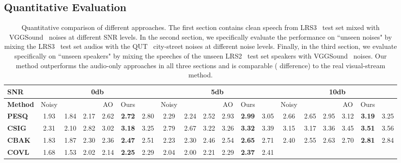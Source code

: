 \documentclass[10pt,twocolumn,letterpaper]{article}
\begin{document}
\subsection{Quantitative Evaluation}


\begin{table*}[ht]
  \setlength{\tabcolsep}{3.1pt}
    \centering
    \caption{Quantitative comparison of different approaches. The first section contains clean speech from LRS3~\cite{Afouras18d} test set mixed with VGGSound~\cite{9053174} noises at different SNR levels. In the second section, we specifically evaluate the performance on ``unseen noises" by mixing the LRS3~\cite{Afouras18d} test set audios with the QUT~\cite{9053174} city-street noises at different noise levels. Finally, in the third section, we evaluate specifically on ``unseen speakers" by mixing the speeches of the unseen LRS2~\cite{Afouras18c} test set speakers with VGGSound~\cite{9053174} noises. Our method outperforms the audio-only approaches in all three sections and is comparable ( difference) to the real visual-stream method.}
    \begin{tabular}{l||ccc|cc|c||ccc|cc|c||ccc|cc|c}
    \hline
    \textbf{SNR} & \multicolumn{6}{c||}{0db} & \multicolumn{6}{c||}{5db} & \multicolumn{6}{c}{10db}
     \\
    \hline
    \textbf{Method} & 
    Noisy & \cite{segan} & \cite{Germain2019SpeechDW} & AO & Ours & \cite{TheConversation_Afouras_2018} & 
    Noisy & \cite{segan} & \cite{Germain2019SpeechDW} & AO & Ours & \cite{TheConversation_Afouras_2018} &  
    Noisy & \cite{segan} & \cite{Germain2019SpeechDW} & AO & Ours & \cite{TheConversation_Afouras_2018} \\
    \hline
    \textbf{PESQ} & 1.93 & 1.84 & 2.17 & 2.62 & \textbf{2.72} & 2.80 &
                    2.29 & 2.24 & 2.52 & 2.93 & \textbf{2.99} & 3.05 &
                    2.66 & 2.65 & 2.95 & 3.12 & \textbf{3.19} & 3.25\\
    \textbf{CSIG} & 2.31 & 2.10 & 2.82 & 3.02 & \textbf{3.18} & 3.25 &
                    2.79 & 2.67 & 3.22 & 3.26 & \textbf{3.32} & 3.39 &
                    3.15 & 3.17 & 3.36 & 3.45 & \textbf{3.51} & 3.56\\
    \textbf{CBAK} & 1.83 & 1.87 & 2.30 & 2.36 & \textbf{2.47} & 2.51 &
                    2.23 & 2.30 & 2.46 & 2.54 & \textbf{2.65} & 2.71 &
                    2.40 & 2.55 & 2.63 & 2.70 & \textbf{2.81} & 2.84\\
    \textbf{COVL} & 1.68 & 1.53 & 2.02 & 2.14 & \textbf{2.25} & 2.29 &
                    2.04 & 2.00 & 2.21 & 2.29 & \textbf{2.37} & 2.41 &

\end{tabular}
\end{table*}
\end{document}
